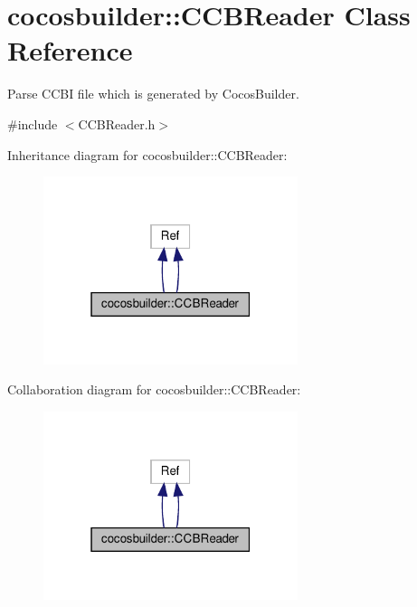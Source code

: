 \hypertarget{classcocosbuilder_1_1CCBReader}{}\section{cocosbuilder\+:\+:C\+C\+B\+Reader Class Reference}
\label{classcocosbuilder_1_1CCBReader}


Parse C\+C\+BI file which is generated by Cocos\+Builder.  




{\ttfamily \#include $<$C\+C\+B\+Reader.\+h$>$}



Inheritance diagram for cocosbuilder\+:\+:C\+C\+B\+Reader\+:
\nopagebreak
\begin{figure}[H]
\begin{center}
\leavevmode
\includegraphics[width=211pt]{classcocosbuilder_1_1CCBReader__inherit__graph}
\end{center}
\end{figure}


Collaboration diagram for cocosbuilder\+:\+:C\+C\+B\+Reader\+:
\nopagebreak
\begin{figure}[H]
\begin{center}
\leavevmode
\includegraphics[width=211pt]{classcocosbuilder_1_1CCBReader__coll__graph}
\end{center}
\end{figure}
